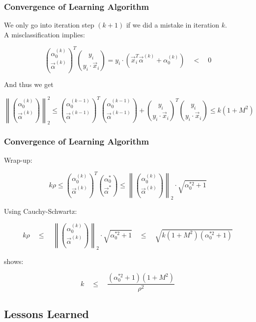 \begin{frame}
  \frametitle{Convergence of Learning Algorithm \cont}

  We only go into iteration step $(k+1)$ if we did a mistake in iteration $k$. \\
  A misclassification implies:
  
  \begin{displaymath}
    { \alpha_0^{(k)} \choose \vec \alpha^{(k)}}^T{y_i \choose y_i\cdot \vec x_i} 
    = y_i\cdot (\vec x_i^T \vec\alpha^{(k)} + \alpha_0^{(k)})\quad < \quad 0
  \end{displaymath}
  \pause 

  And thus we get
  
  \begin{displaymath}
    \left \|  {\alpha_0^{(k)} \choose \vec \alpha^{(k)}}\right\|_2^2 
    \leq { \alpha_0^{(k-1)} \choose \vec \alpha^{(k-1)}} ^T{ \alpha_0^{(k-1)} \choose \vec \alpha^{(k-1)}} 
           + {y_i \choose y_i\cdot \vec x_i}^T{y_i \choose y_i\cdot \vec x_i}
    \leq k(1+M^2)
  \end{displaymath}
\end{frame}


\begin{frame}
  \frametitle{Convergence of Learning Algorithm \cont}

  Wrap-up:
  
  \begin{displaymath}
    k\rho 
    \leq {\alpha_0^{(k)} \choose \vec \alpha^{(k)}}^T{\alpha_0^* \choose \vec \alpha^*} 
    \leq \left \|  {\alpha_0^{(k)} \choose \vec \alpha^{(k)}}\right\|_2\cdot  \sqrt{\alpha_0^{*2}+1}
  \end{displaymath}
  \pause

  Using Cauchy-Schwartz:
  
  \begin{displaymath}
    k\rho\quad
    \leq \quad \left \| {\alpha_0^{(k)} \choose \vec \alpha^{(k)}}\right\|_2\cdot  \sqrt{\alpha_0^{*2}+1}\quad \leq \quad  \sqrt{k(1+M^2)(\alpha_0^{*2}+1)}
  \end{displaymath}
  \pause

  shows:
  
  \begin{displaymath}
    k \quad \leq\quad \frac{(\alpha_0^{*2}+1)(1+M^2)}{\rho^2}
  \end{displaymath}
\end{frame}


\subsection{Lessons Learned}

